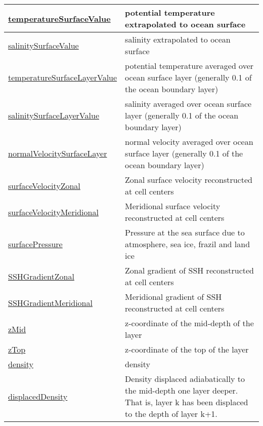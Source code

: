 {\begin{center}
\begin{longtable}{| p{2.0in} | p{4.0in} |}
    \hline
    \hyperref[subsec:var_sec_diagnostics_temperatureSurfaceValue]{temperatureSurfaceValue} & potential temperature extrapolated to ocean surface \\
    \hline
    \hyperref[subsec:var_sec_diagnostics_salinitySurfaceValue]{salinitySurfaceValue} & salinity extrapolated to ocean surface \\
    \hline
    \hyperref[subsec:var_sec_diagnostics_temperatureSurfaceLayerValue]{temperatureSurfaceLayerValue} & potential temperature averaged over ocean surface layer (generally 0.1 of the ocean boundary layer) \\
    \hline
    \hyperref[subsec:var_sec_diagnostics_salinitySurfaceLayerValue]{salinitySurfaceLayerValue} & salinity averaged over ocean surface layer (generally 0.1 of the ocean boundary layer) \\
    \hline
    \hyperref[subsec:var_sec_diagnostics_normalVelocitySurfaceLayer]{normalVelocitySurfaceLayer} & normal velocity averaged over ocean surface layer (generally 0.1 of the ocean boundary layer) \\
    \hline
    \hyperref[subsec:var_sec_diagnostics_surfaceVelocityZonal]{surfaceVelocityZonal} & Zonal surface velocity reconstructed at cell centers \\
    \hline
    \hyperref[subsec:var_sec_diagnostics_surfaceVelocityMeridional]{surfaceVelocityMeridional} & Meridional surface velocity reconstructed at cell centers \\
    \hline
    \hyperref[subsec:var_sec_diagnostics_surfacePressure]{surfacePressure} & Pressure at the sea surface due to atmosphere, sea ice, frazil and land ice \\
    \hline
    \hyperref[subsec:var_sec_diagnostics_SSHGradientZonal]{SSHGradientZonal} & Zonal gradient of SSH reconstructed at cell centers \\
    \hline
    \hyperref[subsec:var_sec_diagnostics_SSHGradientMeridional]{SSHGradientMeridional} & Meridional gradient of SSH reconstructed at cell centers \\
    \hline
    \hyperref[subsec:var_sec_diagnostics_zMid]{zMid} & z-coordinate of the mid-depth of the layer \\
    \hline
    \hyperref[subsec:var_sec_diagnostics_zTop]{zTop} & z-coordinate of the top of the layer \\
    \hline
    \hyperref[subsec:var_sec_diagnostics_density]{density} & density \\
    \hline
    \hyperref[subsec:var_sec_diagnostics_displacedDensity]{displacedDensity} & Density displaced adiabatically to the mid-depth one layer deeper.  That is, layer k has been displaced to the depth of layer k+1. \\

\end{longtable}
\end{center}}
